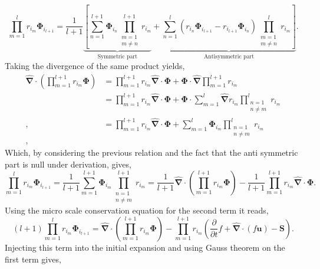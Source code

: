 \documentclass[twocolumn]{My_article}
\newcommand{\nablabh}{\hat{\bm{\nabla}}}
\newcommand{\pddt}{\frac{\partial}{\partial t}}
\begin{document}
\begin{equation}
    \prod^{l}_{m=1} r_{i_m} \bm{\Phi}_{i_{l+1}}
    = \frac{1}{l+1}
    \underbrace{\left[
    \sum_{n=1}^{l+1} \bm{\Phi}_{i_{n}}\prod^{l+1}_{\substack{m=1 \\ m \neq n}} r_{i_m} \right.}_{\text{Symmetric part}}
    +\underbrace{\left.\sum_{n=1}^{l} (r_{i_n}\bm{\Phi}_{i_{l+1}} - r_{i_{l+1}}\bm{\Phi}_{i_{n}}) \prod^{l}_{\substack{m=1 \\ m \neq n}} r_{i_m} \right]}_{\text{Antisymmetric part}}.
\end{equation}
Taking the divergence of the same product yields,
\begin{align*}
    \nablabh \cdot \left(\prod^{l+1}_{m=1} r_{i_m} \bm{\Phi}\right)
    &= \prod^{l+1}_{m=1} r_{i_m} \nablabh \cdot \bm{\Phi}
    + \bm{\Phi} \cdot \nablabh \prod^{l+1}_{m=1} r_{i_m}\\
    &= \prod^{l+1}_{m=1} r_{i_m} \nablabh \cdot \bm{\Phi}
    + \bm{\Phi}  \cdot\sum_{m=1}^l \nablabh r_{i_m}  \prod^{l}_{\substack{n=1 \\ n \neq m}} r_{i_m}\\,
    &= \prod^{l+1}_{m=1} r_{i_m} \nablabh \cdot \bm{\Phi}
    + \sum_{m=1}^l \bm{\Phi}_{i_m}  \prod^{l}_{\substack{n=1 \\ n \neq m}} r_{i_m}\\,
\end{align*}
Which, by considering the previous relation and the fact that the anti symmetric part is null under derivation, gives,
\begin{equation}
    \prod^{l}_{m=1} r_{i_m} \bm{\Phi}_{i_{l+1}}
    =\frac{1}{l+1}\sum_{m=1}^{l+1} \bm{\Phi}_{i_m}  \prod^{l+1}_{\substack{n=1 \\ n \neq m}} r_{i_m}
    =\frac{1}{l+1}\nablabh\cdot \left(\prod^{l+1}_{m=1} r_{i_m} \bm{\Phi}\right)
    - \frac{1}{l+1}\prod^{l+1}_{m=1} r_{i_m} \nablabh\cdot \bm{\Phi}.
\end{equation}
Using the micro scale conservation equation for the second term it reads,
\begin{equation}
    (l+1) \prod^{l}_{m=1} r_{i_m} \bm{\Phi}_{i_{l+1}}
    =\nablabh \cdot \left(\prod^{l+1}_{m=1} r_{i_m} \bm{\Phi}\right)
    - \prod^{l+1}_{m=1} r_{i_m} \left(
        \pddt f
        + \nablabh \cdot (f \textbf{u})
        - \textbf{S}
    \right).
\end{equation}
Injecting this term into the initial expansion and using Gauss theorem on the first term gives,
\end{document}
